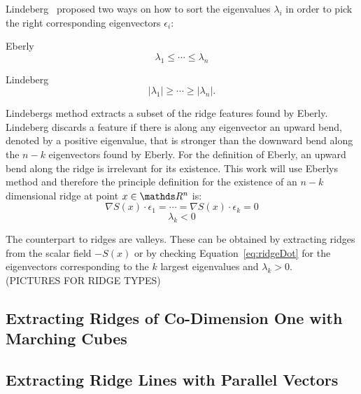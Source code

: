 Lindeberg~\cite{Lindeberg} proposed two ways on how to sort the
eigenvalues $\lambda_i$ in order to pick the right corresponding
eigenvectors $\epsilon_i$:\\
\begin{inparaenum}[]
  \item Eberly
  \begin{equation}
   \lambda_1 \leq \cdots \leq \lambda_n 
  \end{equation}
  \item Lindeberg
  \begin{equation}
    \lvert \lambda_1 \rvert \geq \cdots \geq \lvert \lambda_n \rvert.
  \end{equation}
\end{inparaenum}
Lindebergs method extracts a subset of the ridge features found by
Eberly. Lindeberg discards a feature if there is along any eigenvector
an upward bend, denoted by a positive eigenvalue, that is stronger than
the downward bend along the $n-k$ eigenvectors found by Eberly. For the
definition of Eberly, an upward bend along the ridge is irrelevant for
its existence. This work will use Eberlys method and therefore the
principle definition for the existence of an $n-k$ dimensional ridge at
point $x \in \real^n$ is:\\

\begin{equation}\label{eq:ridgeDot}
  \nabla S(x) \cdot \epsilon_1 = \cdots = \nabla S(x) \cdot \epsilon_{k} = 0
\end{equation}
\begin{equation}
  \lambda_k < 0
\end{equation}

\noindent The counterpart to ridges are valleys. These can be obtained
by extracting ridges from the scalar field $-S(x)$ or by checking
Equation~\ref{eq:ridgeDot} for the eigenvectors corresponding to the
$k$ largest eigenvalues and $\lambda_k > 0$.
\\(PICTURES FOR RIDGE TYPES)

\subsection{Extracting Ridges of Co-Dimension One with Marching Cubes}



\subsection{Extracting Ridge Lines with Parallel Vectors}
